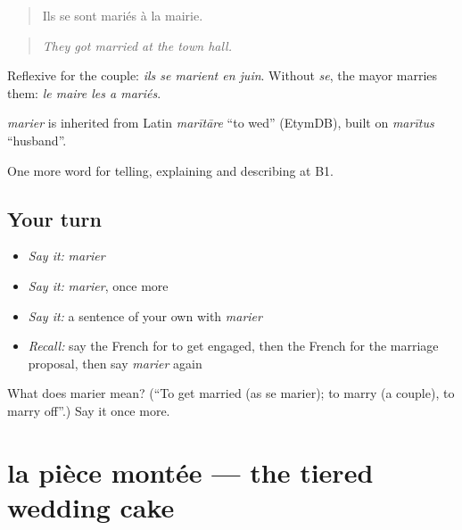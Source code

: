 \begin{quote}
Ils se sont mariés à la mairie.
\end{quote}

\begin{quote}
\emph{They got married at the town hall.}
\end{quote}

Reflexive for the couple: \emph{ils se marient en juin}. Without \emph{se}, the mayor marries them: \emph{le maire les a mariés}.

\begin{cousinweb}
\emph{marier} is inherited from Latin \emph{marītāre} \textquotedblleft{}to wed\textquotedblright{} (EtymDB), built on \emph{marītus} \textquotedblleft{}husband\textquotedblright{}.
\end{cousinweb}

\begin{grammarlens}[title={What you've built}]
One more word for telling, explaining and describing at B1.
\end{grammarlens}

\subsection*{Your turn}
\begin{itemize}
\raggedright
  \item \emph{Say it:} \emph{marier}
  \item \emph{Say it:} \emph{marier}, once more
  \item \emph{Say it:} a sentence of your own with \emph{marier}
  \item \emph{Recall:} say the French for to get engaged, then the French for the marriage proposal, then say \emph{marier} again
\end{itemize}

\begin{tcolorbox}[breakable,colback=teal!4,colframe=teal!35!black,title={Before you move on}]
What does marier mean? (\textquotedblleft{}To get married (as se marier); to marry (a couple), to marry off\textquotedblright{}.) Say it once more.
\end{tcolorbox}
\section[la pièce montée]{la pièce montée — the tiered wedding cake}

\label{lesson:FR-C311-piece-montee}



